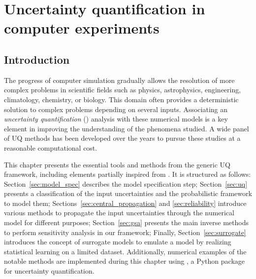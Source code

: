 \cleardoublepage
\chapter{Uncertainty quantification in computer experiments}
\label{chpt:1}
\vspace{-20pt}
\localtableofcontents
\newpage

\section{Introduction}\label{sec:intro}

The progress of computer simulation gradually allows the resolution of more complex problems in scientific fields such as physics, astrophysics, engineering, climatology, chemistry, or biology. 
This domain often provides a deterministic solution to complex problems depending on several inputs. 
Associating an \textit{uncertainty quantification} () analysis with these numerical models is a key element in improving the understanding of the phenomena studied. 
A wide panel of UQ methods has been developed over the years to pursue these studies at a reasonable computational cost. 

This chapter presents the essential tools and methods from the generic UQ framework, including elements partially inspired from \citet{sullivan_2015}. 
It is structured as follows: Section~\ref{sec:model_spec} describes the model specification step; 
Section~\ref{sec:uq} presents a classification of the input uncertainties and the probabilistic framework to model them; 
Sections~\ref{sec:central_propagation} and \ref{sec:reliability} introduce various methods to propagate the input uncertainties through the numerical model for different purposes; 
Section~\ref{sec:gsa} presents the main inverse methods to perform sensitivity analysis in our framework; 
Finally, Section~\ref{sec:surrogate} introduces the concept of surrogate models to emulate a model by realizing statistical learning on a limited dataset.
Additionally, numerical examples of the notable methods are implemented during this chapter using \ot, a Python package for uncertainty quantification.    

